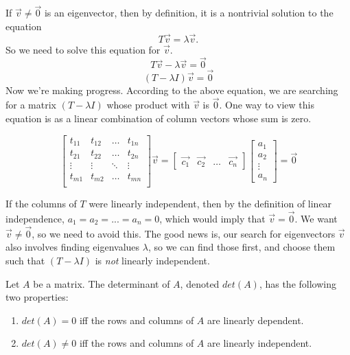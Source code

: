 \documentclass[letterpaper]{article}
\begin{document}
If $\vec{v}\neq\vec{0}$ is an eigenvector, then by definition, it is a nontrivial solution to the equation 
$$T\vec{v}=\lambda\vec{v}.$$
So we need to solve this equation for $\vec{v}$.
$$T\vec{v}-\lambda\vec{v}=\vec{0}$$
$$(T-\lambda I)\vec{v}=\vec{0}$$
Now we're making progress. According to the above equation, we are searching for a matrix $(T-\lambda I)$ whose product with $\vec{v}$ is $\vec{0}$. One way to view this equation is as a linear combination of column vectors whose sum is zero.

\[
\left[ \begin{array}{cccc}
t_{11} & t_{12} & \ldots & t_{1n} \\
t_{21} & t_{22} & \ldots & t_{2n} \\
\vdots & \vdots & \ddots & \vdots \\
t_{m1} & t_{m2} & \ldots & t_{mn} \\
\end{array} \right] \vec{v}
%
=
%
\left[ \begin{array}{cccc}
\vec{c_1} & \vec{c_2} & \ldots & \vec{c_n}
\end{array} \right]
%
%
\left[ \begin{array}{c}
a_1 \\
a_2 \\ 
\vdots \\ 
a_n
\end{array} \right]
%
=
%
\vec{0}
\]

If the columns of $T$ were linearly independent, then by the definition of linear independence, $a_1 = a_2 = ... = a_n = 0$, which would imply that $\vec{v} = \vec{0}$. We want $\vec{v} \neq \vec{0}$, so we need to avoid this. The good news is, our search for eigenvectors $\vec{v}$ also involves finding eigenvalues $\lambda$, so we can find those first, and choose them such that $(T-\lambda I)$ is \emph{not} linearly independent.

\begin{proposition}
\label{prop:determinants}
Let $A$ be a matrix. The determinant of $A$, denoted $det(A)$, has the following two properties: 
\begin{enumerate}
\item $det(A) = 0$ iff the rows and columns of $A$ are linearly dependent.
\item $det(A) \neq 0$ iff the rows and columns of $A$ are linearly independent.\footnotemark
\end{enumerate}
\end{proposition}
\end{document}
